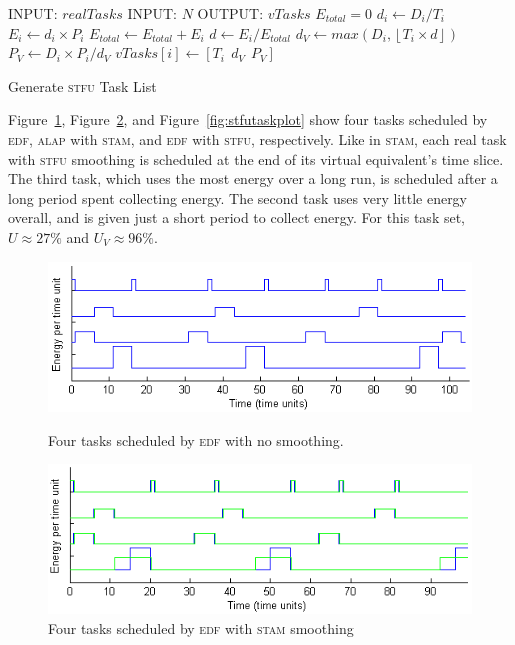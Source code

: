 \begin{algorithm}[htb]
\label{alg:stfualg}
\begin{algorithmic}
\STATE INPUT: $realTasks$  
\STATE INPUT: $N$ 
\STATE OUTPUT: $vTasks$ 
\STATE $E_{total} = 0$
\STATE $d_i \gets D_i / T_i$
\STATE $E_i \gets d_i \times P_i$
\STATE $E_{total} \gets E_{total} +E_i$
\ENDFOR
{}
\STATE $d \gets E_i / E_{total}$
\STATE $d_{V} \gets max(D_i, \left \lfloor T_i \times d \right \rfloor)$
\STATE $P_V \gets D_i \times P_i / d_{V}$
\STATE $vTasks[i] \gets [T_i~~d_{V}~~P_V]$
\ENDFOR
\end{algorithmic}
\caption{Generate \textsc{stfu} Task List}
\end{algorithm}

Figure~\ref{fig:edftasksched}, Figure~\ref{fig:stamtaskplot}, and Figure~\ref{fig:stfutaskplot} show four tasks scheduled by \textsc{edf}, \textsc{alap} with \textsc{stam}, and \textsc{edf} with \textsc{stfu}, respectively.  Like in \textsc{stam}, each real task with \textsc{stfu} smoothing is scheduled at the end of its virtual equivalent's time slice.  The third task, which uses the most energy over a long run, is scheduled after a long period spent collecting energy.  The second task uses very little energy overall, and is given just a short period to collect energy.  For this task set, $U \approx 27\%$ and $U_V \approx 96\%$.


\begin{figure}[htb]
\includegraphics[scale=0.64]{edftasks.png}
\label{fig:edftasksched}
\caption{Four tasks scheduled by \textsc{edf} with no smoothing.}
\end{figure}

\begin{figure}[htb]
\includegraphics[scale=0.64]{stamtasks.png}
\caption{Four tasks scheduled by \textsc{edf} with \textsc{stam} smoothing}
\label{fig:stamtaskplot}
\end{figure}


